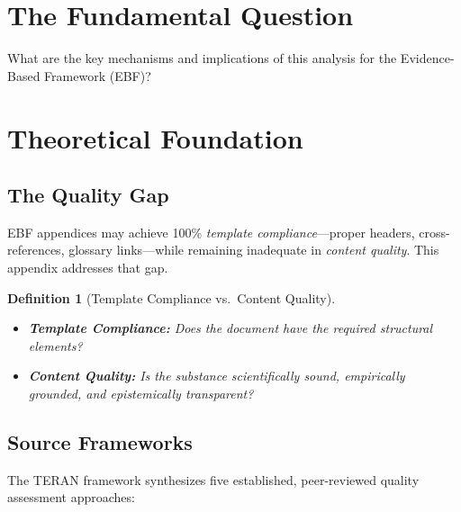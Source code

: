 \documentclass[11pt,a4paper]{article}
\newtheorem{definition}{Definition}[section]
\begin{document}
\section{The Fundamental Question}
\label{sec:qly-fundamental}

\begin{tcolorbox}[colback=red!5!white, colframe=red!75!black,
    title=The Fundamental Question]
What are the key mechanisms and implications of this analysis for the
Evidence-Based Framework (EBF)?
\end{tcolorbox}


\section{Theoretical Foundation}
\label{sec:foundation}

\subsection{The Quality Gap}

EBF appendices may achieve 100\% \emph{template compliance}—proper headers, cross-references, glossary links—while remaining inadequate in \emph{content quality}. This appendix addresses that gap.

\begin{definition}[Template Compliance vs.\ Content Quality]
\begin{itemize}
    \item \textbf{Template Compliance:} Does the document have the required structural elements?
    \item \textbf{Content Quality:} Is the substance scientifically sound, empirically grounded, and epistemically transparent?
\end{itemize}
\end{definition}

\subsection{Source Frameworks}

The TERAN framework synthesizes five established, peer-reviewed quality assessment approaches:
\end{document}
